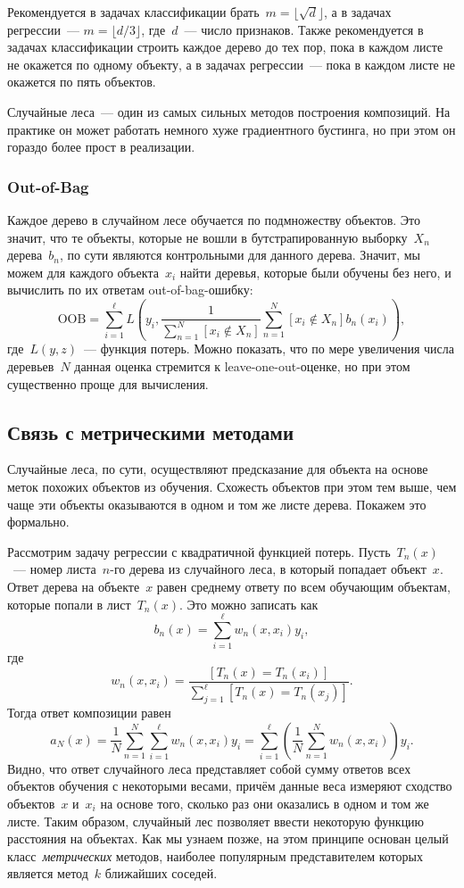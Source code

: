 \documentclass[12pt,fleqn]{article}
\begin{document}
Рекомендуется в задачах классификации брать~$m = \lfloor \sqrt{d} \rfloor$,
а в задачах регрессии~--- $m = \lfloor d/3 \rfloor$,
где~$d$~--- число признаков.
Также рекомендуется в задачах классификации строить каждое дерево до тех
пор, пока в каждом листе не окажется по одному объекту,
а в задачах регрессии~--- пока в каждом листе не окажется по пять объектов.

Случайные леса~--- один из самых сильных методов построения композиций.
На практике он может работать немного хуже градиентного бустинга,
но при этом он гораздо более прост в реализации.

\subsubsection{Out-of-Bag}
Каждое дерево в случайном лесе обучается по подмножеству объектов.
Это значит, что те объекты, которые не вошли в бутстрапированную выборку~$X_n$ дерева~$b_n$,
по сути являются контрольными для данного дерева.
Значит, мы можем для каждого объекта~$x_i$ найти деревья,
которые были обучены без него, и вычислить по их ответам out-of-bag-ошибку:
\[
    \text{OOB}
    =
    \sum_{i = 1}^{\ell}
        L \left(
            y_i,
            \frac{1}{\sum_{n = 1}^{N} [x_i \notin X_n]}
            \sum_{n = 1}^{N}
                [x_i \notin X_n] b_n(x_i)
        \right),
\]
где~$L(y, z)$~--- функция потерь.
Можно показать, что по мере увеличения числа деревьев~$N$
данная оценка стремится к leave-one-out-оценке,
но при этом существенно проще для вычисления.

\subsection{Связь с метрическими методами}
Случайные леса, по сути, осуществляют предсказание для объекта на основе
меток похожих объектов из обучения.
Схожесть объектов при этом тем выше, чем чаще эти объекты оказываются
в одном и том же листе дерева.
Покажем это формально.

Рассмотрим задачу регрессии с квадратичной функцией потерь.
Пусть~$T_n(x)$~--- номер листа~$n$-го дерева из случайного леса,
в который попадает объект~$x$.
Ответ дерева на объекте~$x$ равен среднему ответу по всем
обучающим объектам, которые попали в лист~$T_n(x)$.
Это можно записать как
\[
    b_n(x)
    =
    \sum_{i = 1}^{\ell}
        w_n(x, x_i) y_i,
\]
где
\[
    w_n(x, x_i)
    =
    \frac{
        [T_n(x) = T_n(x_i)]
    }{
        \sum_{j = 1}^{\ell}
            [T_n(x) = T_n(x_j)]
    }.
\]
Тогда ответ композиции равен
\[
    a_N(x)
    =
    \frac{1}{N}
    \sum_{n = 1}^{N}
    \sum_{i = 1}^{\ell}
        w_n(x, x_i) y_i
    =
    \sum_{i = 1}^{\ell} \left(
        \frac{1}{N}
        \sum_{n = 1}^{N}
        w_n(x, x_i)
    \right)
    y_i.
\]
Видно, что ответ случайного леса представляет собой сумму ответов всех
объектов обучения с некоторыми весами,
причём данные веса измеряют сходство объектов~$x$ и~$x_i$
на основе того, сколько раз они оказались в одном и том же листе.
Таким образом, случайный лес позволяет ввести некоторую функцию расстояния на объектах.
Как мы узнаем позже, на этом принципе основан целый класс~\emph{метрических}
методов, наиболее популярным представителем которых является метод~$k$ ближайших соседей.
\end{document}
